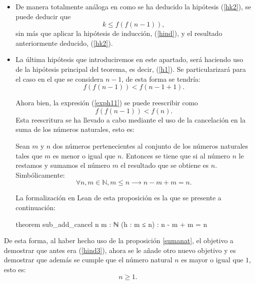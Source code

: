 \begin{demostracion}
\begin{itemize}
\begin{itemize}
      \item De manera totalmente análoga en como se ha deducido
        la hipótesis (\ref{hk2}), se puede deducir que
        \begin{equation}\label{hk3}\tag{hk3}
          k≤f(f(n-1)),
        \end{equation}
        sin más que aplicar la hipótesis de inducción, (\ref{hind}),
        y el resultado anteriormente deducido, (\ref{hk2}).

      \item La última hipótesis que introduciremos en este apartado,
        será haciendo uso de la hipótesis principal del teorema,
        es decir, (\ref{h1}). Se particularizará para el caso en el
        que se considera \(n-1\), de esta forma se tendría:
        \begin{equation}\label{exph11}
          f(f(n-1))<f(n-1+1).
        \end{equation}

        Ahora bien, la expresión (\ref{exph11}) se puede reescribir
        como
        \begin{equation}\label{h11}\tag{h11}
          f(f(n-1))<f(n).
        \end{equation}
        Esta reescritura se ha llevado a cabo mediante el uso de
        la cancelación en la suma de los números naturales, esto es:

        \begin{proposicion}\label{sumanat}
          Sean \(m\) y \(n\) dos números pertenecientes al conjunto
          de los números naturales tales que \(m\) es menor o igual
          que \(n\). Entonces se tiene que si al número \(n\) le
          restamos y sumamos el número \(m\) el resultado que se
          obtiene es \(n\). Simbólicamente:
          \begin{equation}
            ∀n,m ∈ ℕ, m≤n ⟶ n-m+m=n.
          \end{equation}
        \end{proposicion}

        La formalización en Lean de esta proposición es la que se
        presente a continuación:
        \begin{leancode}
          theorem sub_add_cancel {n m : ℕ} (h : m ≤ n) : n - m + m = n 
        \end{leancode}
      \end{itemize}

      De esta forma, al haber hecho uso de la proposición \ref{sumanat}, el objetivo a demostrar que antes era (\ref{hind3}), ahora se
      le añade otro nuevo objetivo y es demostrar que además se
      cumple que el número natural \(n\) es mayor o igual que \(1\),
      esto es:
      \begin{equation}\label{n1}
        n≥1.
      \end{equation}


\end{itemize}
\end{demostracion}
